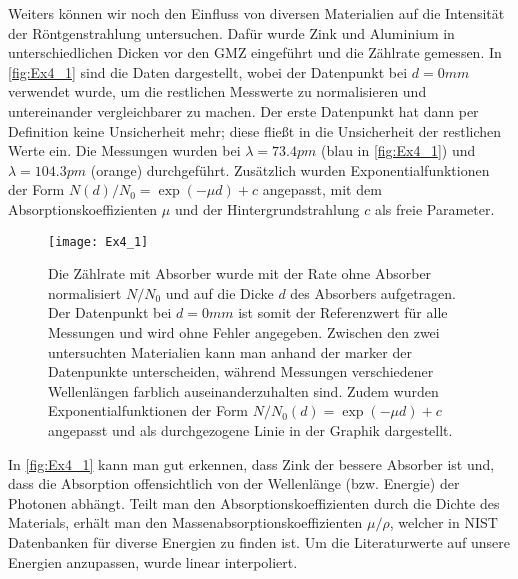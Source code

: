 Weiters können wir noch den Einfluss von diversen Materialien auf die Intensität der Röntgenstrahlung untersuchen. Dafür wurde Zink und Aluminium in unterschiedlichen Dicken vor den GMZ eingeführt und die Zählrate gemessen. In \autoref{fig:Ex4_1} sind die Daten dargestellt, wobei der Datenpunkt bei \( d = 0 \unit{mm} \) verwendet wurde, um die restlichen Messwerte zu normalisieren und untereinander vergleichbarer zu machen. Der erste Datenpunkt hat dann per Definition keine Unsicherheit mehr; diese fließt in die Unsicherheit der restlichen Werte ein. Die Messungen wurden bei \( \lambda = 73.4 \unit{pm} \) (blau in \autoref{fig:Ex4_1}) und \( \lambda = 104.3 \unit{pm} \) (orange) durchgeführt. Zusätzlich wurden Exponentialfunktionen der Form \( N(d)/N_0 = \exp(-\mu d) + c \) angepasst, mit dem Absorptionskoeffizienten \( \mu \) und der Hintergrundstrahlung \( c \) als freie Parameter.

\begin{figure}[H]
	\centering
	\texttt{[image: Ex4\_1]}
	\caption{Die Zählrate mit Absorber wurde mit der Rate ohne Absorber normalisiert \( N/N_0 \) und auf die Dicke \( d \) des Absorbers aufgetragen. Der Datenpunkt bei \( d = 0 \unit{mm} \) ist somit der Referenzwert für alle Messungen und wird ohne Fehler angegeben. Zwischen den zwei untersuchten Materialien kann man anhand der marker der Datenpunkte unterscheiden, während Messungen verschiedener Wellenlängen farblich auseinanderzuhalten sind. Zudem wurden Exponentialfunktionen der Form \( N/N_0(d) = \exp(-\mu d)+c \) angepasst und als durchgezogene Linie in der Graphik dargestellt.}
	\label{fig:Ex4_1}
\end{figure}

In \autoref{fig:Ex4_1} kann man gut erkennen, dass Zink der bessere Absorber ist und, dass die Absorption offensichtlich von der Wellenlänge (bzw. Energie) der Photonen abhängt. Teilt man den Absorptionskoeffizienten durch die Dichte des Materials, erhält man den Massenabsorptionskoeffizienten \( \mu/\rho \), welcher in NIST Datenbanken für diverse Energien zu finden ist. Um die Literaturwerte auf unsere Energien anzupassen, wurde linear interpoliert.

